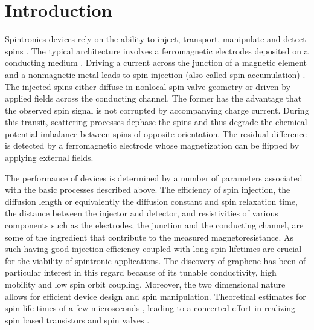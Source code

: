 \section{Introduction}

Spintronics devices rely on the ability to inject, transport, manipulate and detect spins
\cite{Wolf16112001, RevModPhys.76.323}.
The typical architecture involves a ferromagnetic electrodes deposited on a conducting medium
\cite{1990ApPhL..56..665D, Jedema2001}.
Driving a current across the junction of a magnetic element and a nonmagnetic metal
leads to spin injection (also called spin accumulation)
\cite{PhysRevLett.55.1790, Jedema2001, Yang2008, PhysRevLett.94.196601}.
The injected spins either diffuse in nonlocal spin valve geometry
or driven by applied fields across the conducting channel.
The former has the advantage that the observed spin signal
is not corrupted by accompanying charge current.
During this transit, scattering processes dephase the spins
and thus degrade the chemical potential imbalance between spins of opposite orientation.
The residual difference is detected by a ferromagnetic electrode
whose magnetization can be flipped by applying external fields.

The performance of devices is determined by a number of parameters
associated with the basic processes described above.
The efficiency of spin injection, the diffusion length
or equivalently the diffusion constant and spin relaxation time,
the distance between the injector and detector,
and resistivities of various components such as the electrodes,
the junction and the conducting channel,
are some of the ingredient that contribute to the measured magnetoresistance.
As such having good injection efficiency coupled with long spin lifetimes
are crucial for the viability of spintronic applications.
The discovery of graphene
\cite{Novoselov22102004}
has been of particular interest in this regard
because of its tunable conductivity, high mobility and low spin orbit coupling.
Moreover, the two dimensional nature allows for efficient device design and spin manipulation.
Theoretical estimates for spin life times of a few microseconds
\cite{PhysRevB.74.155426, Trauzettel2007},
leading to a concerted effort in realizing spin based transistors and spin valves
\cite{Tombros2007, JJAP.46.L605, Cho2007, PhysRevLett.101.046601, 1704408, Han2012, Han2012369, PhysRevB.80.241403}.

